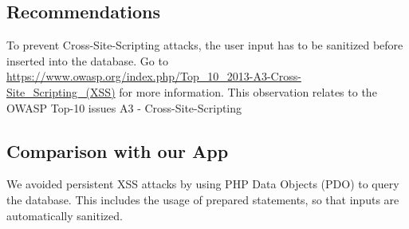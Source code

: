 \subsection{Recommendations}
To prevent Cross-Site-Scripting attacks, the user input has to be sanitized before inserted into the database. Go to \url{https://www.owasp.org/index.php/Top_10_2013-A3-Cross-Site_Scripting_(XSS)} for more information. \newline
This observation relates to the OWASP Top-10 issues A3 - Cross-Site-Scripting

\subsection{Comparison with our App}
We avoided persistent XSS attacks by using PHP Data Objects (PDO) to query the database. 
This includes the usage of prepared statements, so that 
inputs are automatically sanitized.